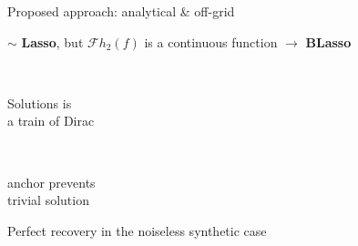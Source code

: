 \begin{frame}{Proposed approach: analytical \& off-grid \hfill\faJediOrder}
        \begin{center}
            \small
            $\sim$ \textbf{Lasso}, but $\mathcal{F}h_2 (f)$ is a continuous function $\to$ \textbf{BLasso}~\cite{bredies2020sparsity}

            \textcolor{mygreen}{ \qquad
            \cmark \, \parbox{8.5em}{Solutions is \\ a train of Dirac} \qquad
            \cmark \, \parbox{8em}{anchor prevents \\ trivial solution}}

            Perfect recovery in the noiseless synthetic case
            \cmark {}
        \end{center}


\end{frame}

